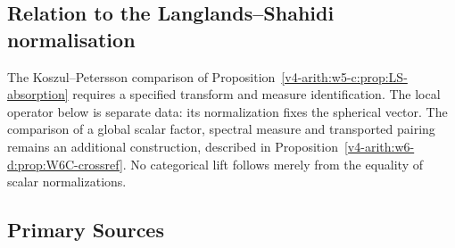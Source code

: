 \subsection{Relation to the Langlands--Shahidi normalisation}
\label{v4-arith:w6-d:domain:w6c}

The Koszul--Petersson comparison of
Proposition~\ref{v4-arith:w5-c:prop:LS-absorption} requires a
specified transform and measure identification. The local operator
below is separate data: its normalization fixes the spherical vector.
The comparison of a global scalar factor, spectral measure and
transported pairing remains an additional construction, described in
Proposition~\ref{v4-arith:w6-d:prop:W6C-crossref}. No categorical
lift follows merely from the equality of scalar normalizations.

\subsection{Primary Sources}
\label{v4-arith:w6-d:domain:sources}

